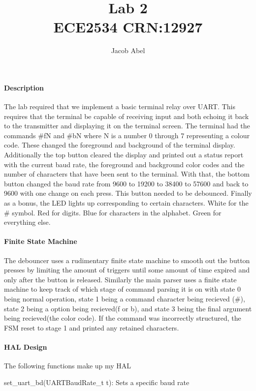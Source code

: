 \documentclass[12pt,letterpaper,notitlepage]{article}
\author{Jacob Abel}
\title{	Lab 2
	\\\large ECE2534 CRN:12927
}
\begin{document}
\maketitle

\begin{raggedright}
\paragraph{Description}
The lab required that we implement a basic terminal relay over UART. This requires that the terminal be capable of receiving input and both echoing it back to the transmitter and displaying it on the terminal screen. The terminal had the commands \#fN and \#bN where N is a number 0 through 7 representing a colour code. These changed the foreground and background of the terminal display. Additionally the top button cleared the display and printed out a status report with the current baud rate, the foreground and background color codes and the number of characters that have been sent to the terminal. With that, the bottom button changed the baud rate from 9600 to 19200 to 38400 to 57600 and back to 9600 with one change on each press. This button needed to be debounced. Finally as a bonus, the LED lights up corresponding to certain characters. White for the \# symbol. Red for digits. Blue for characters in the alphabet. Green for everything else.

\paragraph{Finite State Machine}
The debouncer uses a rudimentary finite state machine to smooth out the button presses by limiting the amount of triggers until some amount of time expired and only after the button is released. Similarly the main parser uses a finite state machine to keep track of which stage of command parsing it is on with state 0 being normal operation, state 1 being a command character being recieved (\#), state 2 being a option being recieved(f or b), and state 3 being the final argument being recieved(the color code). If the command was incorrectly structured, the FSM reset to stage 1 and printed any retained characters.

\paragraph{HAL Design} The following functions make up my HAL

set\_uart\_bd(UARTBaudRate\_t t): Sets a specific baud rate


\end{raggedright}
\end{document}
